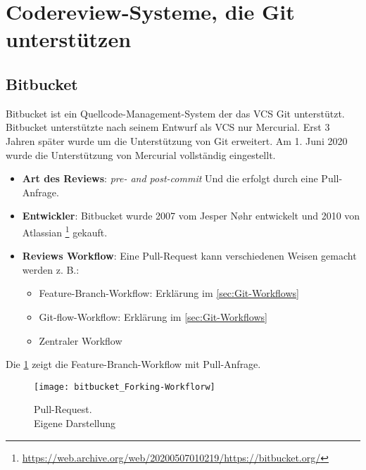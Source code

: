 \section{Codereview-Systeme, die Git unterstützen}
\label{sec:CRS-Git}

\subsection{Bitbucket}
\label{subsec:Bitbucket}

Bitbucket ist ein Quellcode-Management-System der das \ac{VCS} Git unterstützt. Bitbucket unterstützte nach seinem Entwurf als \ac{VCS} nur Mercurial. Erst 3 Jahren später wurde um die Unterstützung von Git erweitert. Am 1. Juni 2020 wurde die Unterstützung von Mercurial vollständig eingestellt.

\begin{itemize}
	\item \textbf{Art des Reviews}: \textit{pre- and post-commit} Und die erfolgt durch eine Pull-Anfrage.
	\item \textbf{Entwickler}: Bitbucket wurde 2007 vom Jesper Nøhr entwickelt und 2010 von Atlassian \footnote{\url{https://web.archive.org/web/20200507010219/https://bitbucket.org/}}
		 gekauft. 
	\item \textbf{Reviews Workflow}: Eine Pull-Request kann verschiedenen Weisen gemacht werden z. B.:
		\begin{itemize}
			\item Feature-Branch-Workflow: Erklärung im \cref{sec:Git-Workflows}
			\item Git-flow-Workflow: Erklärung im \cref{sec:Git-Workflows}
			\item Zentraler Workflow
		\end{itemize}
\end{itemize}

Die \cref{fig:Forking-workflow} zeigt die Feature-Branch-Workflow mit Pull-Anfrage.

\begin{figure}[H]
	\centering
	\texttt{[image: bitbucket\_Forking-Workflorw]}
	\caption[Feature-Branch-Workflow]{Pull-Request.\\Eigene Darstellung}
	\label{fig:Forking-workflow}
\end{figure}		  

